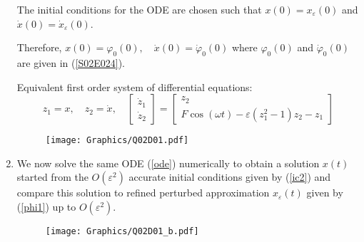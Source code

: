\documentclass[twoside,10pt,a4paper]{article}
\begin{document}
\begin{enumerate}[label=(\roman*)]
The initial conditions for the ODE are chosen such that $x(0) = x_\varepsilon(0)$ and $\dot{x}(0) = \dot{x}_\varepsilon(0)$.

Therefore, $x(0)=\varphi_0(0), \quad \dot{x}(0) = \dot{\varphi}_0(0)$ where $\varphi_0(0)$ and $\dot{\varphi}_0(0)$ are given in (\ref{S02E024}).

Equivalent first order system of differential equations:
\begin{equation}
\label{ode}
	z_1 = x, \quad z_2 = \dot{x}, \quad \begin{bmatrix}
		\dot{z}_1 \\
		\dot{z}_2
	\end{bmatrix} = \begin{bmatrix}
		z_2 \\
		F\cos(\omega t) - \varepsilon(z_1^2 - 1)z_2 - z_1
	\end{bmatrix}
\end{equation}
\begin{figure}[H]
	\centering
	\texttt{[image: Graphics/Q02D01.pdf]}
\end{figure}

\item We now solve the same ODE (\ref{ode}) numerically to obtain a solution $x(t)$ started from the $O(\varepsilon^2)$ accurate initial conditions given by (\ref{ic2}) and compare this solution to refined perturbed approximation $x_\varepsilon(t)$ given by (\ref{phi1}) up to $O(\varepsilon^2)$.

\begin{figure}[H]
	\centering
	\texttt{[image: Graphics/Q02D01\_b.pdf]}
\end{figure}

\end{enumerate}
\end{document}
